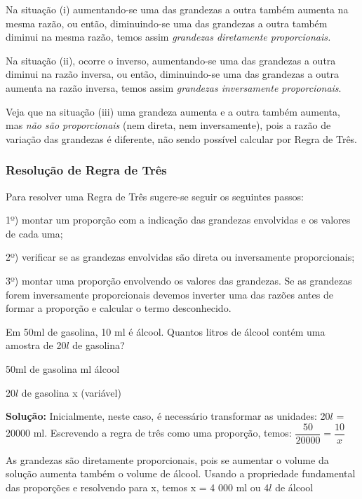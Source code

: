 Na situação (i) aumentando-se uma das grandezas a outra também aumenta na mesma razão, ou então, diminuindo-se uma das grandezas a outra também diminui na mesma razão, temos assim \textit{grandezas diretamente proporcionais.}

Na situação (ii), ocorre o inverso, aumentando-se uma das grandezas a outra diminui na razão inversa, ou então, diminuindo-se uma das grandezas a outra aumenta na razão inversa, temos assim \textit{grandezas inversamente proporcionais}.

Veja que na situação (iii) uma grandeza aumenta e a outra também aumenta, mas \textit{não são proporcionais} (nem direta, nem inversamente), pois a razão de variação das grandezas é diferente, não sendo possível calcular por Regra de Três.


\subsubsection{Resolução de Regra de Três}
	Para resolver uma Regra de Três sugere-se seguir os seguintes passos:

1º) montar um proporção com a indicação das grandezas envolvidas e os valores de cada uma;

2º) verificar se as grandezas envolvidas são direta ou inversamente proporcionais;

3º) montar uma proporção envolvendo os valores das grandezas. Se as grandezas forem inversamente proporcionais devemos inverter uma das razões antes de formar a proporção e calcular o termo desconhecido.

\begin{texemplo}
Em  50ml de gasolina, 10 ml é álcool. Quantos litros de álcool contém uma amostra de  20$l$ de gasolina?

50ml de gasolina \quad \quad \quad {} ml álcool

20$l$ de gasolina \quad \quad \quad \quad x (variável)

\textbf{Solução:} Inicialmente, neste caso, é necessário transformar as unidades: 20$l$ = 20000 ml. Escrevendo a regra de três como uma proporção, temos:
$\dfrac{50}{20000}=\dfrac{10}{x}$ 

As grandezas são diretamente proporcionais, pois se aumentar o volume da solução aumenta também o volume de álcool. 
Usando a propriedade fundamental das proporções e resolvendo para x, temos x = 4 000 ml  ou 4$l$  de álcool \qedsymbol{}
\end{texemplo}

